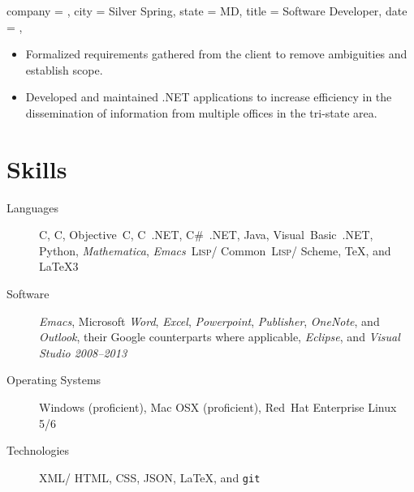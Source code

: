 \documentclass{bettercv}
\newcommand \software[1] {\textsl{#1}}
\newcommand \CPP        {{C\nolinebreak[4]\hspace{-.05em}\raisebox{.4ex}{\tiny\bf ++}}}
\newcommand \CSharp     {{C\#}}
\newcommand \Lisp       {{\textsc{Lisp}}}
\begin{document}
\begin{position}
  {
    company = \cwc,
    city    = Silver Spring,
    state   = MD,
    title   = Software Developer,
    date    = ,
  }

\begin{itemize}
\item Formalized requirements gathered from the client to remove ambiguities and establish scope.
\item Developed and maintained .NET applications to increase efficiency in the dissemination of information from multiple offices in the tri-state area.
\end{itemize}
\end{position}

\section{Skills}

\begin{description}
\item[Languages]
  C,
  \CPP,
  Objective~C,
  \CPP~.NET,
  \CSharp~.NET,
  Java,
  Visual~Basic~.NET,
  Python,
  \software{Mathematica},
  \software{Emacs}~\Lisp\slash
            Common~\Lisp\slash
            Scheme,
  \TeX,
  and \LaTeX3

\item[Software]
  \software{Emacs},
  Microsoft \software{Word},
            \software{Excel},
            \software{Powerpoint},
            \software{Publisher},
            \software{OneNote},
            and \software{Outlook},
  their Google counterparts where applicable,
  \software{Eclipse},
  and \software{Visual Studio 2008--2013}

\item[Operating Systems]
  Windows (proficient),
  Mac OSX (proficient),
  Red~Hat Enterprise Linux 5\slash 6

\item[Technologies]
  XML\slash
  HTML,
  CSS,
  JSON,
  \LaTeX,
  and \texttt{git}
\end{description}
\end{document}
